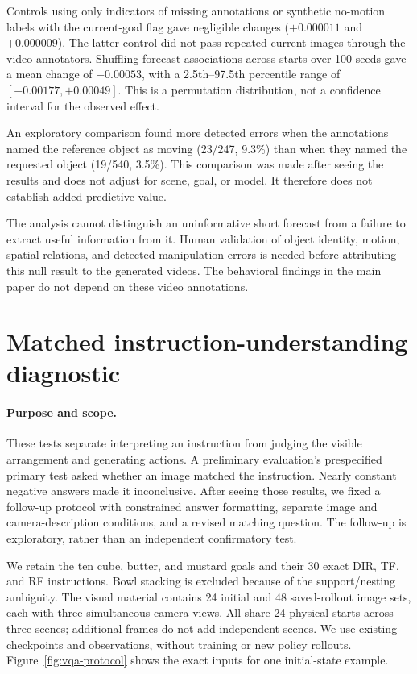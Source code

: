 \documentclass{article}
\begin{document}
Controls using only indicators of missing annotations or synthetic no-motion labels with the current-goal flag gave negligible changes ($+0.000011$ and $+0.000009$). The latter control did not pass repeated current images through the video annotators. Shuffling forecast associations across starts over 100 seeds gave a mean change of $-0.00053$, with a 2.5th--97.5th percentile range of $[-0.00177,+0.00049]$. This is a permutation distribution, not a confidence interval for the observed effect.

An exploratory comparison found more detected errors when the annotations named the reference object as moving (23/247, 9.3\%) than when they named the requested object (19/540, 3.5\%). This comparison was made after seeing the results and does not adjust for scene, goal, or model. It therefore does not establish added predictive value.

The analysis cannot distinguish an uninformative short forecast from a failure to extract useful information from it. Human validation of object identity, motion, spatial relations, and detected manipulation errors is needed before attributing this null result to the generated videos. The behavioral findings in the main paper do not depend on these video annotations.

\clearpage
\section{Matched instruction-understanding diagnostic}
\label{app:vqa}

\paragraph{Purpose and scope.}
These tests separate interpreting an instruction from judging the visible arrangement and generating actions. A preliminary evaluation's prespecified primary test asked whether an image matched the instruction. Nearly constant negative answers made it inconclusive. After seeing those results, we fixed a follow-up protocol with constrained answer formatting, separate image and camera-description conditions, and a revised matching question. The follow-up is exploratory, rather than an independent confirmatory test.

We retain the ten cube, butter, and mustard goals and their 30 exact DIR, TF, and RF instructions. Bowl stacking is excluded because of the support/nesting ambiguity. The visual material contains 24 initial and 48 saved-rollout image sets, each with three simultaneous camera views. All share 24 physical starts across three scenes; additional frames do not add independent scenes. We use existing checkpoints and observations, without training or new policy rollouts. Figure~\ref{fig:vqa-protocol} shows the exact inputs for one initial-state example.
\end{document}
